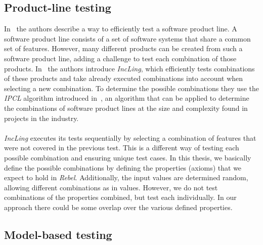 \subsection{Product-line testing}
In~\cite{al2016incling} the authors describe a way to efficiently test a software product line. A software product line consists of a set of software systems that share a common set of features. However, many different products can be created from such a software product line, adding a challenge to test each combination of those products. In~\cite{al2016incling} the authors introduce \textit{IncLing}, which efficiently tests combinations of these products and take already executed combinations into account when selecting a new combination. To determine the possible combinations they use the \textit{IPCL} algorithm introduced in~\cite{johansen2012algorithm}, an algorithm that can be applied to determine the combinations of software product lines at the size and complexity found in projects in the industry.\\
\\
\textit{IncLing} executes its tests sequentially by selecting a combination of features that were not covered in the previous test. This is a different way of testing each possible combination and ensuring unique test cases. In this thesis, we basically define the possible combinations by defining the properties (axioms) that we expect to hold in \textit{Rebel}. Additionally, the input values are determined random, allowing different combinations as in values. However, we do not test combinations of the properties combined, but test each individually. In our approach there could be some overlap over the various defined properties.

\subsection{Model-based testing}
